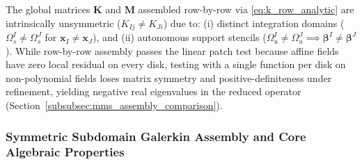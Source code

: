 \documentclass[VANCOUVER,Times1COL]{WileyNJD-v5}
\begin{document}
\begin{remark}
    The global matrices $\mathbf{K}$ and $\mathbf{M}$ assembled row-by-row via \eqref{eq:k_row_analytic} are intrinsically unsymmetric ($K_{Ij} \ne K_{Ji}$) \cite{atluri2002meshless, liu2001local} due to: (i) distinct integration domains ($\Omega_s^I \ne \Omega_s^J$ for $\mathbf{x}_I \ne \mathbf{x}_J$), and (ii) autonomous support stencils ($\Omega_u^I \ne \Omega_u^J \implies \boldsymbol{\beta}^I \ne \boldsymbol{\beta}^J$). While row-by-row assembly passes the linear patch test because affine fields have zero local residual on every disk, testing with a single function per disk on non-polynomial fields loses matrix symmetry and positive-definiteness under refinement, yielding negative real eigenvalues in the reduced operator (Section~\ref{subsubsec:mms_assembly_comparison}).
\end{remark}

\subsubsection{Symmetric Subdomain Galerkin Assembly and Core Algebraic Properties}
\label{subsubsec:symmetric_assembly}
\end{document}
